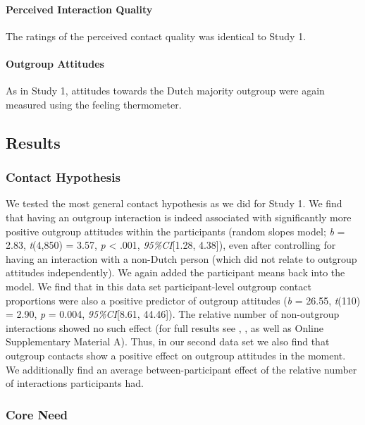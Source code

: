 \paragraph{Perceived Interaction Quality}

The ratings of the perceived contact quality was identical to Study 1.

\paragraph{Outgroup Attitudes}

As in Study 1, attitudes towards the Dutch majority outgroup were again
measured using the feeling thermometer.

\subsection{Results}

\subsubsection{Contact Hypothesis}

We tested the most general contact hypothesis as we did for Study 1. We
find that having an outgroup interaction is indeed associated with
significantly more positive outgroup attitudes within the participants
(random slopes model; \textit{b} = 2.83, \textit{t}(4,850) = 3.57,
\textit{p} \textless{} .001, \textit{95\%CI}{[}1.28, 4.38{]}), even
after controlling for having an interaction with a non-Dutch person
(which did not relate to outgroup attitudes independently). We again
added the participant means back into the model. We find that in this
data set participant-level outgroup contact proportions were also a
positive predictor of outgroup attitudes (\textit{b} = 26.55,
\textit{t}(110) = 2.90, \textit{p} = 0.004, \textit{95\%CI}{[}8.61,
44.46{]}). The relative number of non-outgroup interactions showed no
such effect (for full results see ,
, as well as Online Supplementary Material
A). Thus, in our second data set we also find that outgroup contacts
show a positive effect on outgroup attitudes in the moment. We
additionally find an average between-participant effect of the relative
number of interactions participants had.

\subsubsection{Core Need}

